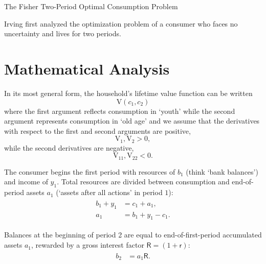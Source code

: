 \documentclass{scrartcl}
\begin{document}
\handoutHeader

{\centerline {\LARGE The Fisher Two-Period Optimal Consumption Problem }}\vspace{0.15in}



  Irving \cite{fisherInterestTheory} first analyzed the optimization
  problem of a consumer who faces no uncertainty and lives for two
  periods.

  \section{Mathematical Analysis}

  In its most general form, the household's lifetime value function can be written
  \[
    \mathrm{V}(\boldsymbol{\mathit{c}}_{1},\boldsymbol{\mathit{c}}_{2})
  \]
  where the first argument reflects consumption in `youth' while the second argument represents consumption in `old age' and we assume that the derivatives with respect to the first and second arguments are positive,
  \begin{equation}
    \mathrm{V}_{1}, \mathrm{V}_{2} > 0, \label{eq:uprimepos}
  \end{equation}
  while the second derivatives are negative,
  \begin{equation}
    \mathrm{V}_{11}, \mathrm{V}_{22}<0 \label{eq:uprimeprimeneg}.
  \end{equation}

  The consumer begins the first period with resources of $\boldsymbol{\mathit{b}}_{1}$ (think `bank balances') and income of $\boldsymbol{\mathit{y}}_{1}$.
  Total resources are divided between consumption and end-of-period assets $\boldsymbol{\mathit{a}}_{1}$ (`assets after all actions' in period ${1}$):
  \begin{equation}\begin{gathered}\begin{aligned}
        \boldsymbol{\mathit{b}}_{1}+\boldsymbol{\mathit{y}}_{1} & =  \boldsymbol{\mathit{c}}_{1}+\boldsymbol{\mathit{a}}_{1},
        \\ \boldsymbol{\mathit{a}}_{1} & =  \boldsymbol{\mathit{b}}_{1}+\boldsymbol{\mathit{y}}_{1}-\boldsymbol{\mathit{c}}_{1}.
      \end{aligned}\end{gathered}\end{equation}

  Balances at the beginning of period 2 are equal to end-of-first-period accumulated assets $\boldsymbol{\mathit{a}}_{1}$, rewarded by a gross interest factor $\mathsf{R} = (1+\mathsf{r})$:
  \begin{equation}\begin{gathered}\begin{aligned}
        \boldsymbol{\mathit{b}}_{2} & =  \boldsymbol{\mathit{a}}_{1}\mathsf{R}.
      \end{aligned}\end{gathered}\end{equation}
\end{document}
